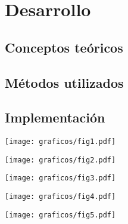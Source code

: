 \section{Desarrollo}
    
    \subsection{Conceptos teóricos}

    \subsection{Métodos utilizados}

    \subsection{Implementación}


    \begin{center}
      \texttt{[image: graficos/fig1.pdf]}
    \end{center}

    \begin{center}
      \texttt{[image: graficos/fig2.pdf]}
    \end{center}

    \begin{center}
      \texttt{[image: graficos/fig3.pdf]}
    \end{center}

        \begin{center}
      \texttt{[image: graficos/fig4.pdf]}
    \end{center}

        \begin{center}
      \texttt{[image: graficos/fig5.pdf]}
    \end{center}